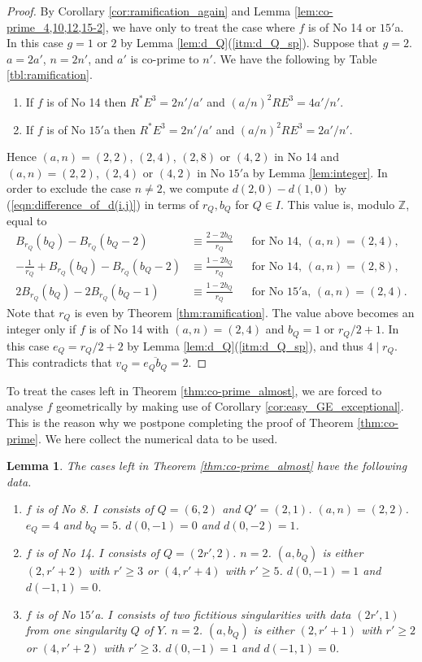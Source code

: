 \documentclass[a4paper,11pt]{amsart}
\newtheorem{lemma}[theorem]{Lemma}
\theoremstyle{definition}
\theoremstyle{remark}
\numberwithin{equation}{section}
\newcommand{\bZ}{{\mathbb Z}}
\begin{document}
\begin{proof}
By Corollary \ref{cor:ramification_again} and
Lemma \ref{lem:co-prime_4,10,12,15-2},
we have only to treat the case where $f$ is of No 14 or $\textrm{15}'$a.
In this case $g=1$ or $2$ by Lemma \ref{lem:d_Q}(\ref{itm:d_Q_sp}).
Suppose that $g=2$.
$a=2a'$, $n=2n'$, and $a'$ is co-prime to $n'$.
We have the following by Table \ref{tbl:ramification}.
\begin{enumerate}
\item
If $f$ is of No 14 then
$R^*E^3=2n'/a'$ and $(a/n)^2RE^3=4a'/n'$.
\item
If $f$ is of No $\textrm{15}'$a then
$R^*E^3=2n'/a'$ and $(a/n)^2RE^3=2a'/n'$.
\end{enumerate}
Hence
$(a,n)=(2,2)$, $(2,4)$, $(2,8)$ or $(4,2)$ in No 14
and $(a,n)=(2,2)$, $(2,4)$ or $(4,2)$ in No $\textrm{15}'$a
by Lemma \ref{lem:integer}.
In order to exclude the case $n \neq 2$,
we compute $d(2,0)-d(1,0)$ by (\ref{eqn:difference_of_d(i,j)})
in terms of $r_Q,b_Q$ for $Q \in I$.
This value is, modulo $\bZ$, equal to
\begin{align*}
B_{r_Q}(b_Q)-B_{r_Q}(b_Q-2) &\equiv\frac{2-2b_Q}{r_Q}
&& \textrm{for No 14, $(a,n)=(2,4)$}, \\
-\frac{1}{r_Q}+B_{r_Q}(b_Q)-B_{r_Q}(b_Q-2) &\equiv\frac{1-2b_Q}{r_Q}
&& \textrm{for No 14, $(a,n)=(2,8)$}, \\
2B_{r_Q}(b_Q)-2B_{r_Q}(b_Q-1) &\equiv\frac{1-2b_Q}{r_Q}
&& \textrm{for No $\textrm{15}'$a, $(a,n)=(2,4)$}.
\end{align*}
Note that $r_Q$ is even by Theorem \ref{thm:ramification}.
The value above becomes an integer only if
$f$ is of No 14 with $(a,n)=(2,4)$ and $b_Q=1$ or $r_Q/2+1$.
In this case $e_Q=r_Q/2+2$ by Lemma \ref{lem:d_Q}(\ref{itm:d_Q_sp}),
and thus $4 \mid r_Q$.
This contradicts that $v_Q=\overline{e_Qb_Q}=2$.
\end{proof}

To treat the cases left in Theorem \ref{thm:co-prime_almost},
we are forced to analyse $f$ geometrically
by making use of Corollary \ref{cor:easy_GE_exceptional}.
This is the reason why
we postpone completing the proof of Theorem \ref{thm:co-prime}.
We here collect the numerical data to be used.

\begin{lemma}\label{lem:data}
The cases left in Theorem \textup{\ref{thm:co-prime_almost}}
have the following data.
\begin{enumerate}
\item
$f$ is of No 8.
$I$ consists of $Q=(6,2)$ and $Q'=(2,1)$.
$(a,n)=(2,2)$.
$e_Q=4$ and $b_Q=5$.
$d(0,-1)=0$ and $d(0,-2)=1$.
\item
$f$ is of No 14.
$I$ consists of $Q=(2r',2)$.
$n=2$.
$(a,b_Q)$ is either $(2,r'+2)$ with $r'\ge3$ or $(4,r'+4)$ with $r'\ge5$.
$d(0,-1)=1$ and $d(-1,1)=0$.
\item
$f$ is of No $\textrm{15}'$a.
$I$ consists of two fictitious singularities with data $(2r',1)$
from one singularity $Q$ of $Y$.
$n=2$.
$(a,b_Q)$ is either $(2,r'+1)$ with $r'\ge2$ or $(4,r'+2)$ with $r'\ge3$.
$d(0,-1)=1$ and $d(-1,1)=0$.
\end{enumerate}
\end{lemma}
\end{document}
